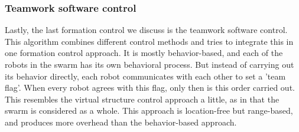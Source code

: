 \subsubsection{Teamwork software control}
Lastly, the last formation control we discuss is the teamwork software control. \cite{kaminka2013use}
This algorithm combines different control methods and tries to integrate this in one formation control approach.
It is mostly behavior-based, and each of the robots in the swarm has its own behavioral process. 
But instead of carrying out its behavior directly, each robot communicates with each other to set a 'team flag'. 
When every robot agrees with this flag, only then is this order carried out. 
This resembles the virtual structure control approach a little, as in that the swarm is considered as a whole. 
This approach is location-free but range-based, and produces more overhead than the behavior-based approach.

